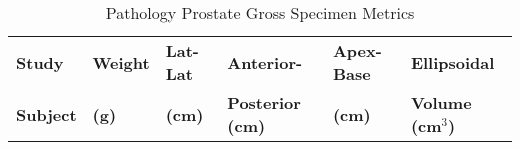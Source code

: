 \begin{table}[h!]
\centering
\caption{Pathology Prostate Gross Specimen Metrics}
\begin{tabular}{|l|l|l|l|l|l|} \hline
{\bf Study } & {\bf Weight} & {\bf Lat-Lat} & {\bf Anterior-} & {\bf Apex-Base} & {\bf Ellipsoidal} \\
{\bf Subject} & {\bf (g)} & {\bf (cm)} & {\bf Posterior (cm)} & {\bf (cm)} & {\bf Volume (cm$^3$)} \\ \hline

\hline
\end{tabular}
\label{tab:path_data}
\end{table}
